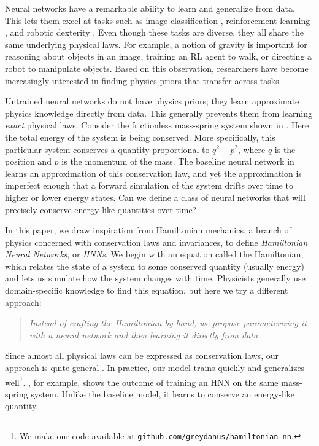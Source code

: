 \documentclass{article}
\begin{document}
Neural networks have a remarkable ability to learn and generalize from data. This lets them excel at tasks such as image classification \cite{krizhevsky2012imagenet-classification-with-deep}, reinforcement learning \cite{yosinski2011evolving-robot-gaits,mnih2013playing-atari-with,silver2017mastering}, and robotic dexterity \cite{Andrychowicz2018Learning, levine2018learning}. Even though these tasks are diverse, they all share the same underlying physical laws. For example, a notion of gravity is important for reasoning about objects in an image, training an RL agent to walk, or directing a robot to manipulate objects. Based on this observation, researchers have become increasingly interested in finding physics priors that transfer across tasks \cite{Watters2017Visual, Santoro2017Simple, Hamrick2018Relational, De2018End, chang2016compositional, tenenbaum-2000-Science-a-global-geometric-framework}.

Untrained neural networks do not have physics priors; they learn approximate physics knowledge directly from data. This generally prevents them from learning \textit{exact} physical laws. Consider the frictionless mass-spring system shown in . Here the total energy of the system is being conserved. More specifically, this particular system conserves a quantity proportional to $q^2 + p^2$, where $q$ is the position and $p$ is the momentum of the mass. The baseline neural network in  learns an approximation of this conservation law, and yet the approximation is imperfect enough that a forward simulation of the system drifts over time to higher or lower energy states.
Can we define a class of neural networks that will precisely conserve energy-like quantities over time?

In this paper, we draw inspiration from Hamiltonian mechanics, a branch of physics concerned with conservation laws and invariances, to define \emph{Hamiltonian Neural Networks}, or \emph{HNNs}. We begin with an equation called the Hamiltonian, which relates the state of a system to some conserved quantity (usually energy) and lets us simulate how the system changes with time. Physicists generally use domain-specific knowledge to find this equation, but here we try a different approach:
\begin{quote}\textit{Instead of crafting the Hamiltonian by hand, we propose parameterizing it with a neural network and then learning it directly from data.}
\end{quote}
Since almost all physical laws can be expressed as conservation laws, our approach is quite general \cite{noether1971invariant}. In practice, our model trains quickly and generalizes well\footnote{We make our code available at \texttt{github.com/greydanus/hamiltonian-nn}.}. , for example, shows the outcome of training an HNN on the same mass-spring system. Unlike the baseline model, it learns to conserve an energy-like quantity.
\end{document}
